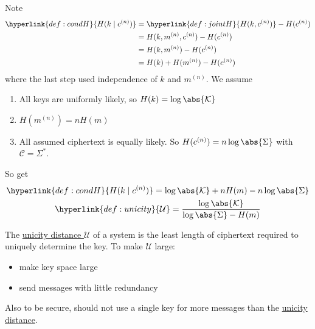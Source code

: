\documentclass{article}
\newcommand{\1}[1]{\mathbbm{1}_{#1}}
\begin{document}
Note
\begin{align*}
    \hyperlink{def:condH}{H(k\mid c^{(n)})} &= \hyperlink{def:jointH}{H(k, c^{(n)})} - H(c^{(n)}) \\
                 &= H(k, m^{(n)}, c^{(n)}) - H(c^{(n)}) \\
                 &= H(k, m^{(n)}) - H(c^{(n)}) \\
                 &= H(k) + H(m^{(n)}) - H(c^{(n)})
\end{align*}
where the last step used independence of $k$ and $m^{(n)}$.
We assume
\begin{enumerate}[label=(\arabic*)]
    \item All keys are uniformly likely, so $H(k) = \log \abs{\mathcal{K}}$
    \item $H(m^{(n)})  = n H(m)$
    \item All assumed ciphertext is equally likely. So $ H(c^{(n)}) = n \log \abs{\Sigma} $ with $\mathcal{C} = \Sigma^*$.
\end{enumerate}

So get
\begin{gather*}
    \hyperlink{def:condH}{H(k \mid c^{(n)})} = \log \abs{\mathcal{K}} + n H(m) - n \log \abs{\Sigma} \\
    \hyperlink{def:unicity}{\mathcal{U}} = \frac{\log \abs{\mathcal{K}}}{\log \abs{\Sigma} - H(m)}
\end{gather*}

\begin{remark}
    The \hyperlink{def:unicity}{unicity distance }$\mathcal{U}$ of a system is the least length of ciphertext required to uniquely determine the key.
    To make $\mathcal{U}$ large:
    \begin{itemize}
        \item make key space large
        \item send messages with little redundancy
    \end{itemize}
    Also to be secure, should not use a single key for more messages than the \hyperlink{def:unicity}{unicity distance}.
\end{remark}
\end{document}
